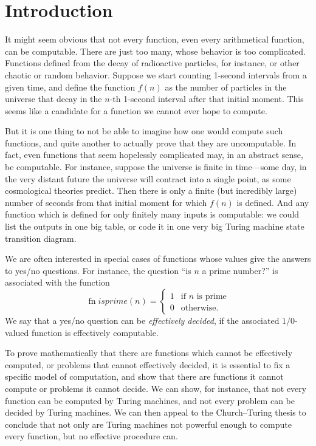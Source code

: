 \documentclass[10pt,a4paper]{article}
\theoremstyle{plain}
\theoremstyle{definition}
\theoremstyle{remark}
\newcommand*{\olfileid}[3]{}
\newcommand*{\olsection}[1]{\section*{#1}}
\providecommand{\fn}{\operatorname{fn}}
\begin{document}



\olfileid{tur}{und}{int} 
\olsection{Introduction}

It might seem obvious that not every function, even every arithmetical
function, can be computable. There are just too many, whose behavior
is too complicated.  Functions defined from the decay of radioactive
particles, for instance, or other chaotic or random behavior. Suppose
we start counting 1-second intervals from a given time, and define the
function $f(n)$ as the number of particles in the universe that decay
in the $n$-th 1-second interval after that initial moment.  This seems
like a candidate for a function we cannot ever hope to compute.

But it is one thing to not be able to imagine how one would compute
such functions, and quite another to actually prove that they are
uncomputable.  In fact, even functions that seem hopelessly
complicated may, in an abstract sense, be computable.  For instance,
suppose the universe is finite in time---some day, in the very distant
future the universe will contract into a single point, as some
cosmological theories predict. Then there is only a finite (but
incredibly large) number of seconds from that initial moment for which
$f(n)$ is defined.  And any function which is defined for only finitely
many inputs is computable: we could list the outputs in one big table,
or code it in one very big Turing machine state transition diagram.

We are often interested in special cases of functions whose values give
the answers to yes/no questions.  For instance, the question ``is $n$
a prime number?'' is associated with the function
\[
\fn{isprime}(n) = \begin{cases}
  1 & \text{if $n$ is prime}\\
  0 & \text{otherwise.}
  \end{cases}
\]
We say that a yes/no question can be \emph{effectively decided}, if
the associated $1/0$-valued function is effectively computable.

To prove mathematically that there are functions which cannot be
effectively computed, or problems that cannot effectively decided, it
is essential to fix a specific model of computation, and show
that there are functions it cannot compute or problems it cannot
decide.  We can show, for instance, that not every function can be
computed by Turing machines, and not every problem can be decided by
Turing machines.  We can then appeal to the Church--Turing thesis to
conclude that not only are Turing machines not powerful enough to
compute every function, but no effective procedure can.
\end{document}
